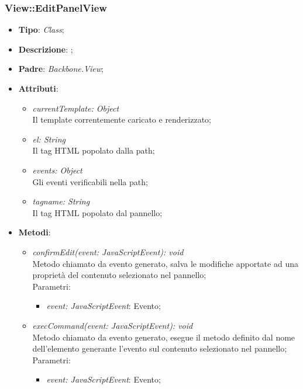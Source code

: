 \documentclass[../DefinizioneDiProdotto.tex]{subfiles}
\begin{document}
				\subsubsection{View::EditPanelView}
					\hypertarget{SWEDesigner::Client::View::EditPanelView}{}
					\begin{itemize}
						\item \textbf{Tipo}: \emph{Class};
						\item \textbf{Descrizione}: ;
						\item \textbf{Padre}: \emph{Backbone.View};
						\item \textbf{Attributi}:
						\begin{itemize}
							\item \emph{currentTemplate: Object}\\
							Il template correntemente caricato e renderizzato;
							\item \emph{el: String} \\
							Il tag HTML popolato dalla path;
							\item \emph{events: Object} \\
							Gli eventi verificabili nella path;
							\item \emph{tagname: String} \\
							Il tag HTML popolato dal pannello;
						\end{itemize}
						\item \textbf{Metodi}:
						\begin{itemize}
							\item \emph{confirmEdit(event: JavaScriptEvent): void} \\
							Metodo chiamato da evento generato, salva le modifiche apportate ad una proprietà del contenuto selezionato nel pannello; \\
							Parametri:
							\begin{itemize}
								\item \emph{event: JavaScriptEvent}: Evento;
							\end{itemize}
							\item \emph{execCommand(event: JavaScriptEvent): void} \\
							Metodo chiamato da evento generato, esegue il metodo definito dal nome dell'elemento generante l'evento sul contenuto selezionato nel pannello; \\
							Parametri:
							\begin{itemize}
								\item \emph{event: JavaScriptEvent}: Evento;

\end{itemize}
\end{itemize}
\end{itemize}
\end{document}
